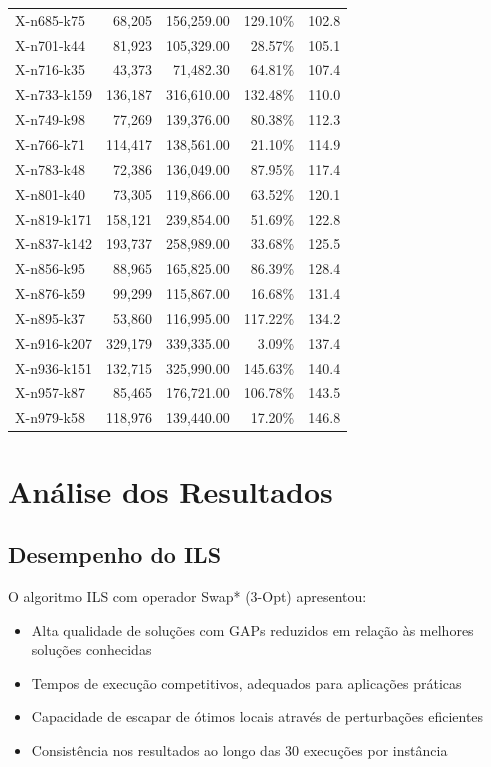 \documentclass[12pt,a4paper]{article}
\begin{document}
\begin{longtable}{@{}lrrrr@{}}
    X-n685-k75 & 68,205 & 156,259.00 & 129.10\% & 102.8 \\
    X-n701-k44 & 81,923 & 105,329.00 & 28.57\% & 105.1 \\
    X-n716-k35 & 43,373 & 71,482.30 & 64.81\% & 107.4 \\
    X-n733-k159 & 136,187 & 316,610.00 & 132.48\% & 110.0 \\
    X-n749-k98 & 77,269 & 139,376.00 & 80.38\% & 112.3 \\
    X-n766-k71 & 114,417 & 138,561.00 & 21.10\% & 114.9 \\
    X-n783-k48 & 72,386 & 136,049.00 & 87.95\% & 117.4 \\
    X-n801-k40 & 73,305 & 119,866.00 & 63.52\% & 120.1 \\
    X-n819-k171 & 158,121 & 239,854.00 & 51.69\% & 122.8 \\
    X-n837-k142 & 193,737 & 258,989.00 & 33.68\% & 125.5 \\
    X-n856-k95 & 88,965 & 165,825.00 & 86.39\% & 128.4 \\
    X-n876-k59 & 99,299 & 115,867.00 & 16.68\% & 131.4 \\
    X-n895-k37 & 53,860 & 116,995.00 & 117.22\% & 134.2 \\
    X-n916-k207 & 329,179 & 339,335.00 & 3.09\% & 137.4 \\
    X-n936-k151 & 132,715 & 325,990.00 & 145.63\% & 140.4 \\
    X-n957-k87 & 85,465 & 176,721.00 & 106.78\% & 143.5 \\
    X-n979-k58 & 118,976 & 139,440.00 & 17.20\% & 146.8 \\
\end{longtable}

\clearpage

\section{Análise dos Resultados}

\subsection{Desempenho do ILS}

O algoritmo ILS com operador Swap* (3-Opt) apresentou:

\begin{itemize}
    \item Alta qualidade de soluções com GAPs reduzidos em relação às melhores soluções conhecidas
    \item Tempos de execução competitivos, adequados para aplicações práticas
    \item Capacidade de escapar de ótimos locais através de perturbações eficientes
    \item Consistência nos resultados ao longo das 30 execuções por instância
\end{itemize}
\end{document}
